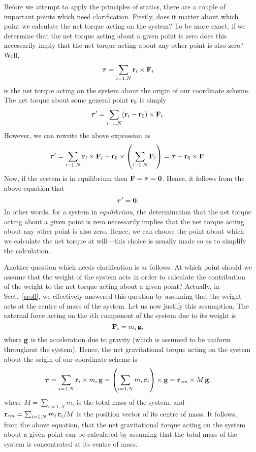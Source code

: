 Before we attempt to apply the principles of statics, there are a couple
of important points which need clarification. Firstly, does it matter about
which point we calculate the net torque acting on the system? To be more
exact, if we determine that the net torque acting about a given point
is zero does this necessarily imply that the net torque acting about any
other point is also zero? Well, 
\begin{equation}
\mbox{\boldmath$\tau$} = \sum_{i=1,N} {\bf r}_i\times {\bf F}_i
\end{equation}
is the net torque acting on the system about the origin of our coordinate scheme.
The net torque about some general point ${\bf r}_0$ is simply
\begin{equation}
\mbox{\boldmath$\tau$}' = \sum_{i=1,N} ({\bf r}_i-{\bf r}_0)\times {\bf F}_i.
\end{equation}
However, we can rewrite the above expression as
\begin{equation}
\mbox{\boldmath$\tau$}' = \sum_{i=1,N} {\bf r}_i\times {\bf F}_i - {\bf r}_0\times \left(\sum_{i=1,N}{\bf F}_i\right)
=\mbox{\boldmath$\tau$} + {\bf r}_0\times {\bf F} .
\end{equation}
Now, if the system is in equilibrium then ${\bf F} = \mbox{\boldmath$\tau$} ={\bf 0}$. Hence, it follows
from the above equation that
\begin{equation}
\mbox{\boldmath$\tau$}' = {\bf 0}.
\end{equation}
In other words, for a system in {\em equilibrium}, the determination that the net torque acting
about a given point is zero necessarily implies that the net torque acting about
any other point is also zero. Hence, we can choose the point about which we calculate the
net torque at will---this choice is usually made so as to simplify the calculation.

Another question which needs clarification is as follows. At which point should
we assume that the weight of the system acts in order to calculate the contribution
of the weight to the net torque acting about a given point? Actually, in Sect.~\ref{sroll},
we effectively answered this question by assuming that the weight 
acts at the centre of mass of the system. Let
us now justify this assumption. The external force acting on the $i$th component
of the system due to its weight is
\begin{equation}
{\bf F}_i = m_i\,{\bf g},
\end{equation}
where ${\bf g}$ is the acceleration due to gravity (which is assumed to be uniform
throughout the system). Hence, the net gravitational torque acting on the system about the
origin of our coordinate scheme is
\begin{equation}
\mbox{\boldmath$\tau$} = \sum_{i=1,N} {\bf r}_i\times m_i\,{\bf g} =
\left(\sum_{i=1,N} m_i\,{\bf r}_i\right)\times {\bf g} = {\bf r}_{cm}\times M\,{\bf g},
\end{equation}
where $M=\sum_{i=1,N}m_i$ is the total mass of the system, and
${\bf r}_{cm} = \sum_{i=1,N} m_i\,{\bf r}_i/M$ is the position vector of its centre of mass.
It follows, from the above equation, that the net gravitational torque acting on the system
about a given point can be calculated by assuming that the total mass of the system is
concentrated at its centre of mass.

